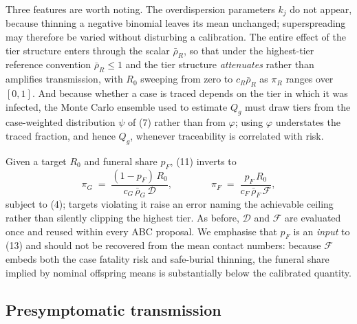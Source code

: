 \documentclass[9pt,letterpaper]{extarticle}
\begin{document}
Three features are worth noting. The overdispersion parameters $k_j$ do not appear, because thinning a negative binomial leaves its mean unchanged; superspreading may therefore be varied without disturbing a calibration. The entire effect of the tier structure enters through the scalar $\bar{\rho}_R$, so that under the highest-tier reference convention $\bar{\rho}_R \le 1$ and the tier structure \emph{attenuates} rather than amplifies transmission, with $R_0$ sweeping from zero to $c_R \bar{\rho}_R$ as $\pi_R$ ranges over $[0,1]$. And because whether a case is traced depends on the tier in which it was infected, the Monte Carlo ensemble used to estimate $Q_g$ must draw tiers from the case-weighted distribution $\psi$ of (7) rather than from $\varphi$; using $\varphi$ understates the traced fraction, and hence $Q_g$, whenever traceability is correlated with risk.

Given a target $R_0$ and funeral share $p_F$, (11) inverts to
\begin{equation}
\pi_G \;=\; \frac{(1 - p_F)\, R_0}{c_G\, \bar{\rho}_G\, \mathcal{D}},
\qquad\qquad
\pi_F \;=\; \frac{p_F\, R_0}{c_F\, \bar{\rho}_F\, \mathcal{F}} ,
\end{equation}
subject to (4); targets violating it raise an error naming the achievable ceiling rather than silently clipping the highest tier. As before, $\mathcal{D}$ and $\mathcal{F}$ are evaluated once and reused within every ABC proposal. We emphasise that $p_F$ is an \emph{input} to (13) and should not be recovered from the mean contact numbers: because $\mathcal{F}$ embeds both the case fatality risk and safe-burial thinning, the funeral share implied by nominal offspring means is substantially below the calibrated quantity.

\subsection{Presymptomatic transmission}
\end{document}
